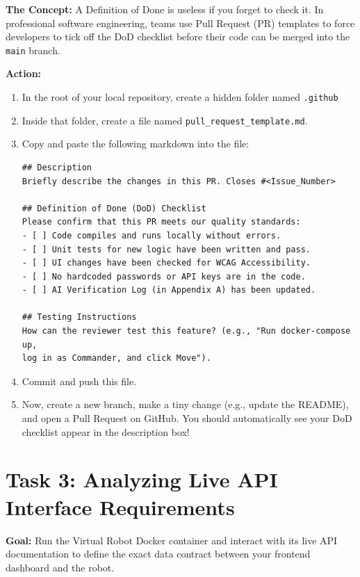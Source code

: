 \documentclass[a4paper,12pt]{article}
\begin{document}
\textbf{The Concept:} A Definition of Done is useless if you forget to check it. In professional software engineering, teams use Pull Request (PR) templates to force developers to tick off the DoD checklist before their code can be merged into the \texttt{main} branch.

\vspace{0.3cm}
\textbf{Action:}
\begin{enumerate}
    \item In the root of your local repository, create a hidden folder named \texttt{.github}
    \item Inside that folder, create a file named \texttt{pull\_request\_template.md}.
    \item Copy and paste the following markdown into the file:
    \begin{verbatim}
## Description
Briefly describe the changes in this PR. Closes #<Issue_Number>

## Definition of Done (DoD) Checklist
Please confirm that this PR meets our quality standards:
- [ ] Code compiles and runs locally without errors.
- [ ] Unit tests for new logic have been written and pass.
- [ ] UI changes have been checked for WCAG Accessibility.
- [ ] No hardcoded passwords or API keys are in the code.
- [ ] AI Verification Log (in Appendix A) has been updated.

## Testing Instructions
How can the reviewer test this feature? (e.g., "Run docker-compose up, 
log in as Commander, and click Move").
    \end{verbatim}
    \item Commit and push this file.
    \item Now, create a new branch, make a tiny change (e.g., update the README), and open a Pull Request on GitHub. You should automatically see your DoD checklist appear in the description box!
\end{enumerate}


\section*{Task 3: Analyzing Live API Interface Requirements}

\textbf{Goal:} Run the Virtual Robot Docker container and interact with its live API documentation to define the exact data contract between your frontend dashboard and the robot.
\end{document}

